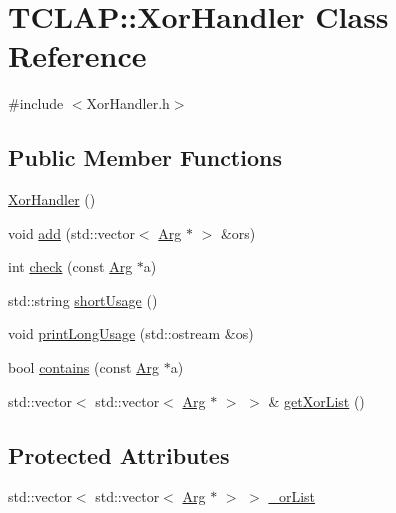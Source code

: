 \hypertarget{class_t_c_l_a_p_1_1_xor_handler}{}\section{T\+C\+L\+A\+P\+:\+:Xor\+Handler Class Reference}
\label{class_t_c_l_a_p_1_1_xor_handler}


{\ttfamily \#include $<$Xor\+Handler.\+h$>$}

\subsection*{Public Member Functions}
\begin{DoxyCompactItemize}
\item 
\hyperlink{class_t_c_l_a_p_1_1_xor_handler_a195391f50b7fe5eb939c2f6d236f571e}{Xor\+Handler} ()
\item 
void \hyperlink{class_t_c_l_a_p_1_1_xor_handler_a76f156bf36a8aede334801aa242f31b9}{add} (std\+::vector$<$ \hyperlink{class_t_c_l_a_p_1_1_arg}{Arg} $\ast$ $>$ \&ors)
\item 
int \hyperlink{class_t_c_l_a_p_1_1_xor_handler_a3df7722e4c4c5d331de69fc902336b00}{check} (const \hyperlink{class_t_c_l_a_p_1_1_arg}{Arg} $\ast$a)
\item 
std\+::string \hyperlink{class_t_c_l_a_p_1_1_xor_handler_aca185a80e9df6e4250a230fa5aec7891}{short\+Usage} ()
\item 
void \hyperlink{class_t_c_l_a_p_1_1_xor_handler_a257a855934eb343a0fad3c4e5fe5ff57}{print\+Long\+Usage} (std\+::ostream \&os)
\item 
bool \hyperlink{class_t_c_l_a_p_1_1_xor_handler_a1a74fab4667cc591a1e3094c91bc942d}{contains} (const \hyperlink{class_t_c_l_a_p_1_1_arg}{Arg} $\ast$a)
\item 
std\+::vector$<$ std\+::vector$<$ \hyperlink{class_t_c_l_a_p_1_1_arg}{Arg} $\ast$ $>$ $>$ \& \hyperlink{class_t_c_l_a_p_1_1_xor_handler_a0e0d95c697d227cc51f82424b8530182}{get\+Xor\+List} ()
\end{DoxyCompactItemize}
\subsection*{Protected Attributes}
\begin{DoxyCompactItemize}
\item 
std\+::vector$<$ std\+::vector$<$ \hyperlink{class_t_c_l_a_p_1_1_arg}{Arg} $\ast$ $>$ $>$ \hyperlink{class_t_c_l_a_p_1_1_xor_handler_a4ebd5b96e23a0ab03bdd431fe622d4e1}{\+\_\+or\+List}
\end{DoxyCompactItemize}


